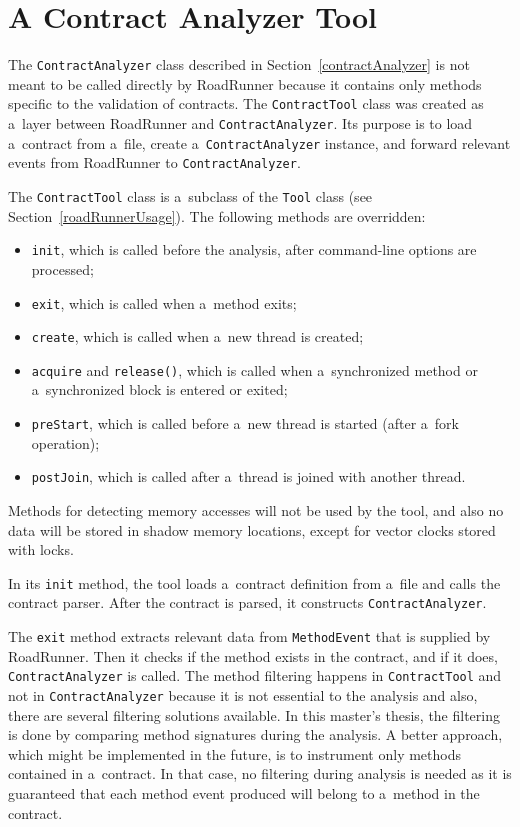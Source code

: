 \section{A Contract Analyzer Tool}
\label{contractTool}

The \texttt{ContractAnalyzer} class described in Section~\ref{contractAnalyzer}
is not meant to be called directly by RoadRunner because it contains only
methods specific to the validation of contracts. The \texttt{ContractTool} class
was created as a~layer between RoadRunner and \texttt{ContractAnalyzer}. Its
purpose is to load a~contract from a~file, create a~\texttt{ContractAnalyzer}
instance, and forward relevant events from RoadRunner to
\texttt{ContractAnalyzer}.

The \texttt{ContractTool} class is a~subclass of the \texttt{Tool} class (see
Section~\ref{roadRunnerUsage}). The following methods are overridden:
\begin{itemize}
    \item \texttt{init}, which is called before the analysis, after
        command-line options are processed;
    \item \texttt{exit}, which is called when a~method exits;
    \item \texttt{create}, which is called when a~new thread is created;
    \item \texttt{acquire} and \texttt{release()}, which is called when
        a~synchronized method or a~synchronized block is entered or exited;
    \item \texttt{preStart}, which is called before a~new thread is started
        (after a~fork operation);
    \item \texttt{postJoin}, which is called after a~thread is joined with
        another thread.
\end{itemize}

Methods for detecting memory accesses will not be used by the tool, and also no
data will be stored in shadow memory locations, except for vector clocks stored
with locks.

In its \texttt{init} method, the tool loads a~contract definition from a~file
and calls the contract parser. After the contract is parsed, it constructs
\texttt{ContractAnalyzer}.

The \texttt{exit} method extracts relevant data from \texttt{MethodEvent} that
is supplied by RoadRunner. Then it checks if the method exists in the contract,
and if it does, \texttt{ContractAnalyzer} is called. The method filtering
happens in \texttt{ContractTool} and not in \texttt{ContractAnalyzer} because it
is not essential to the analysis and also, there are several filtering solutions
available. In this master's thesis, the filtering is done by comparing method
signatures during the analysis. A better approach, which might be implemented in
the future, is to instrument only methods contained in a~contract. In that case,
no filtering during analysis is needed as it is guaranteed that each method
event produced will belong to a~method in the contract.

